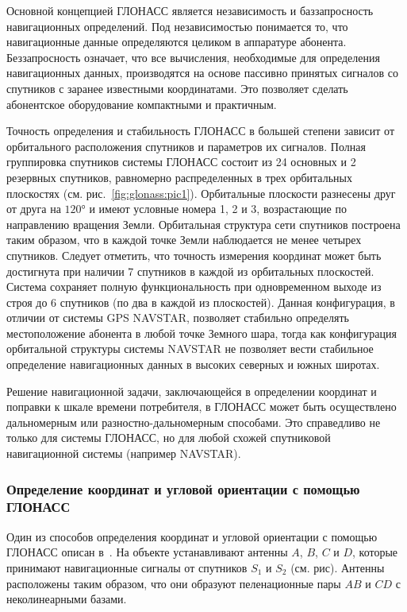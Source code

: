 \documentclass[../main.tex]{subfiles}
\begin{document}
Основной концепцией ГЛОНАСС является независимость и баззапросность навигационных определений. Под независимостью понимается то, что навигационные данные определяются целиком в аппаратуре абонента. Беззапросность означает, что все вычисления, необходимые для определения навигационных данных, производятся на основе пассивно принятых сигналов со спутников с заранее известными координатами. Это позволяет сделать абонентское оборудование компактными и практичным.

Точность определения и стабильность ГЛОНАСС в большей степени зависит от орбитального расположения спутников и параметров их сигналов. Полная группировка спутников системы ГЛОНАСС состоит из 24 основных и 2 резервных спутников, равномерно распределенных в трех орбитальных плоскостях (см. рис.~\ref{fig:glonass:pic1}). Орбитальные плоскости разнесены друг от друга на $\ang{120}$ и имеют условные номера 1, 2 и 3, возрастающие по направлению вращения Земли. Орбитальная структура сети спутников построена таким образом, что в каждой точке Земли наблюдается не менее четырех спутников. Следует отметить, что точность измерения координат может быть достигнута при наличии 7 спутников в каждой из орбитальных плоскостей. Система сохраняет полную функциональность при одновременном выходе из строя до 6 спутников (по два в каждой из плоскостей). Данная конфигурация, в отличии от системы GPS NAVSTAR, позволяет стабильно определять местоположение абонента в любой точке Земного шара, тогда как конфигурация орбитальной структуры системы NAVSTAR не позволяет вести стабильное определение навигационных данных в высоких северных и южных широтах.

Решение навигационной задачи, заключающейся в определении координат и поправки к шкале времени потребителя, в ГЛОНАСС может быть осуществлено дальномерным или разностно-дальномерным способами. Это справедливо не только для системы ГЛОНАСС, но для любой схожей спутниковой навигационной системы (например NAVSTAR).

\subsubsection{Определение координат и угловой ориентации с помощью ГЛОНАСС}
Один из способов определения координат и угловой ориентации с помощью ГЛОНАСС описан в~\cite{patent}. На объекте устанавливают антенны $A$, $B$, $C$ и $D$, которые принимают навигационные сигналы от спутников $S_1$ и $S_2$ (см. рис). Антенны расположены таким образом, что они образуют пеленационные пары $AB$ и $CD$ с неколинеарными базами.
\end{document}
